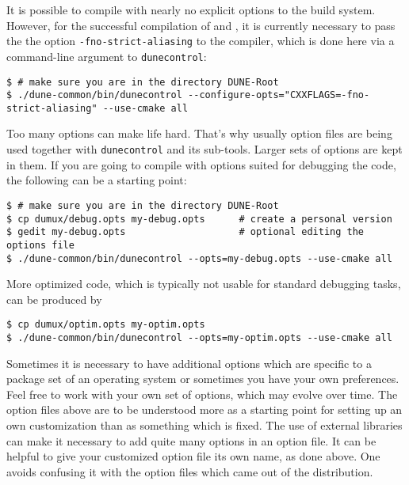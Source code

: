 It is possible to compile \Dumux with nearly no explicit options to the build system.
However, for the successful compilation of \Dune and \Dumux, it is currently necessary to pass the
the option \texttt{-fno-strict-aliasing} to the \Cplusplus compiler,
which is done here via a command-line argument to \texttt{dunecontrol}:
\begin{lstlisting}[style=Bash]
$ # make sure you are in the directory DUNE-Root
$ ./dune-common/bin/dunecontrol --configure-opts="CXXFLAGS=-fno-strict-aliasing" --use-cmake all
\end{lstlisting}

Too many options can make life hard. That's why usually option files are being used together with \texttt{dunecontrol} and its sub-tools.
Larger sets of options are kept in them. If you are going to compile with options suited for debugging the code, the following
can be a starting point:
\begin{lstlisting}[style=Bash]
$ # make sure you are in the directory DUNE-Root
$ cp dumux/debug.opts my-debug.opts      # create a personal version
$ gedit my-debug.opts                    # optional editing the options file
$ ./dune-common/bin/dunecontrol --opts=my-debug.opts --use-cmake all
\end{lstlisting}

More optimized code, which is typically not usable for standard debugging tasks, can be produced by
\begin{lstlisting}[style=Bash]
$ cp dumux/optim.opts my-optim.opts
$ ./dune-common/bin/dunecontrol --opts=my-optim.opts --use-cmake all
\end{lstlisting}

Sometimes it is necessary to have additional options which
are specific to a package set of an operating system or
sometimes you have your own preferences.
Feel free to work with your own set of options, which may evolve over time.
The option files above are to be understood more as a starting point
for setting up an own customization than as something which is fixed.
The use of external libraries can make it necessary to add quite many options in an option file.
It can be helpful to give your customized option file its own name, as done above.
One avoids confusing it with the option files which came out of the distribution.

